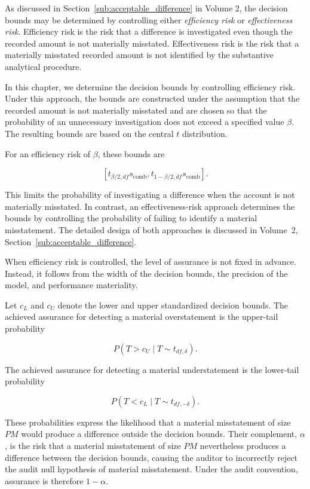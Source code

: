 As discussed in Section~\ref{sub:acceptable_difference} in Volume 2, the decision bounds may be determined by controlling either \emph{efficiency risk} or \emph{effectiveness risk}. Efficiency risk is the risk that a difference is investigated even though the recorded amount is not materially misstated. Effectiveness risk is the risk that a materially misstated recorded amount is not identified by the substantive analytical procedure.

In this chapter, we determine the decision bounds by controlling efficiency risk. Under this approach, the bounds are constructed under the assumption that the recorded amount is not materially misstated and are chosen so that the probability of an unnecessary investigation does not exceed a specified value \(\beta\). The resulting bounds are based on the central \(t\) distribution.

For an efficiency risk of \(\beta\), these bounds are

\begin{equation}
\left[
t_{\beta/2,df}s_{\text{comb}},
t_{1-\beta/2,df}s_{\text{comb}}
\right].
\end{equation}

This limits the probability of investigating a difference when the account is not materially misstated. In contrast, an effectiveness-risk approach determines the bounds by controlling the probability of failing to identify a material misstatement. The detailed design of both approaches is discussed in Volume~2, Section~\ref{sub:acceptable_difference}.

When efficiency risk is controlled, the level of assurance is not fixed in advance. Instead, it follows from the width of the decision bounds, the precision of the model, and performance materiality.

Let $c_L$ and $c_U$ denote the lower and upper standardized decision bounds. The achieved assurance for detecting a material overstatement is the upper-tail probability

\begin{equation}
P(T > c_U \mid T \sim t_{df,\delta}).
\end{equation}

The achieved assurance for detecting a material understatement is the lower-tail probability

\begin{equation}
P(T < c_L \mid T \sim t_{df,-\delta}).
\end{equation}

These probabilities express the likelihood that a material misstatement of size $PM$ would produce a difference outside the decision bounds. Their complement, $\alpha$, is the risk that a material misstatement of size $PM$ nevertheless produces a difference between the decision bounds, causing the auditor to incorrectly reject the audit null hypothesis of material misstatement. Under the audit convention, assurance is therefore $1-\alpha$.

